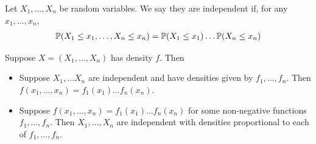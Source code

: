 \documentclass{../../template/note}
\begin{document}
    \begin{definition}[Independence]
        Let \(X_1, \dots, X_n\) be random variables. We say they are independent if, for any \(x_1, \dots, x_n\),
        \begin{align*}
            \mathbb P(X_1 \leq x_1, \dots, X_n \leq x_n) = \mathbb P(X_1 \leq x_1) \dots \mathbb P(X_n \leq x_n)
        \end{align*}
    \end{definition}
    
    \begin{proposition}
        Suppose \(X = (X_1, \dots, X_n)\) has density \(f\). Then
        \begin{itemize}
            \item Suppose \(X_1, \dots X_n\) are independent and have densities given by \(f_1, \dots, f_n\). Then \(f(x_1, \dots, x_n) = f_1(x_1) \dots f_n(x_n)\).
            \item Suppose \(f(x_1, \dots, x_n) = f_1(x_1) \dots f_n(x_n)\) for some non-negative functions \(f_1, \dots, f_n\). Then \(X_1, \dots, X_n\) are independent with densities proportional to each of \(f_1, \dots, f_n\).
        \end{itemize}
    \end{proposition}
    
\end{document}
